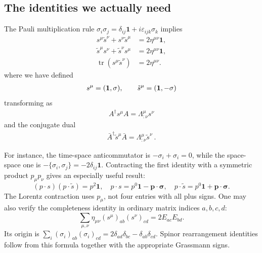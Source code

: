 \documentclass[11pt]{article}
\newcommand{\tr}{\operatorname{tr}}
\newcommand{\eps}{\varepsilon}
\newcommand{\one}{\mathbf 1}
\begin{document}
\subsection{The identities we actually need}
The Pauli multiplication rule
\(\sigma_i\sigma_j=\delta_{ij}\one+i\eps_{ijk}\sigma_k\)
implies
\begin{align}
 s^\mu\widetilde s^\nu+s^\nu\widetilde s^\mu
    &=2\eta^{\mu\nu}\one,\nonumber\\
 \widetilde s^\mu s^\nu+\widetilde s^\nu s^\mu
    &=2\eta^{\mu\nu}\one,\label{eq:sigmaclifford}\\
 \tr(s^\mu\widetilde s^\nu)&=2\eta^{\mu\nu}.
 \label{eq:sigmatrace}
\end{align}
where we have defined
\begin{align}
    s^\mu=({\bf 1},{\bf \sigma}),\qquad \tilde{s}^\mu=({\bf 1},-{\bf \sigma})
\end{align}
transforming as
\begin{align}
    A^\dagger s^\mu A=\Lambda^\mu_{:\nu} s^\nu
\end{align}
and the conjugate dual
\begin{align}
    \bar{A}^\dagger \tilde{s}^\mu \bar{A}=\Lambda^\mu_{:\nu} \tilde{s}^\nu\ .
\end{align}

For instance, the time-space anticommutator is
\(-\sigma_i+\sigma_i=0\), while the space-space one is
\(-\{\sigma_i,\sigma_j\}=-2\delta_{ij}\one\).
Contracting the first identity with a symmetric product \(p_\mu p_\nu\)
gives an especially useful result:
\begin{equation}
 (p\cdot s)(p\cdot\widetilde s)=p^2\one,
 \quad p\cdot s=p^0\one-\bm p\cdot\bm\sigma,
 \quad p\cdot\widetilde s=p^0\one+\bm p\cdot\bm\sigma.
 \label{eq:sigmap}
\end{equation}
The Lorentz contraction uses \(p_\mu\), not four entries with all plus
signs. One may also verify the completeness identity in ordinary
matrix indices \(a,b,c,d\):
\begin{equation}
 \sum_{\mu,\nu}\eta_{\mu\nu}(s^\mu)_{ab}(s^\nu)_{cd}
       =2 E_{ac}E_{bd}.
 \label{eq:completeness}
\end{equation}
Its origin is
\(\sum_i(\sigma_i)_{ab}(\sigma_i)_{cd}
=2\delta_{ad}\delta_{bc}-\delta_{ab}\delta_{cd}\).
Spinor rearrangement identities follow from this formula together
with the appropriate Grassmann signs.
\end{document}
